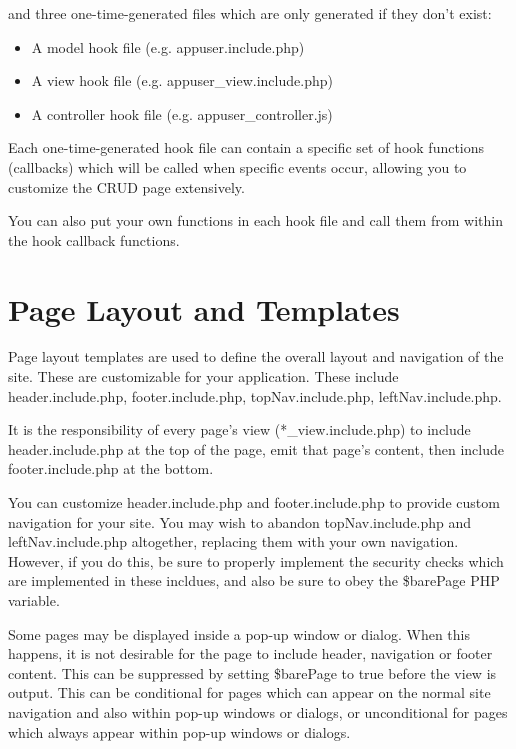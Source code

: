 \documentclass[letterpaper,10pt,english]{sphinxmanual}
\begin{document}
and three one-time-generated files which are only generated if they don't exist:
\begin{itemize}
\item {} 
A model hook file (e.g. appuser.include.php)

\item {} 
A view hook file (e.g. appuser\_view.include.php)

\item {} 
A controller hook file (e.g. appuser\_controller.js)

\end{itemize}

Each one-time-generated hook file can contain a specific set of hook functions (callbacks) which
will be called when specific events occur, allowing you to customize the CRUD page extensively.

You can also put your own functions in each hook file and call them from within the hook callback
functions.


\section{Page Layout and Templates}
\label{jaxFrameworkGuide:page-layout-and-templates}
Page layout templates are used to define the overall layout and navigation of the site.  These are
customizable for your application.  These include header.include.php, footer.include.php,
topNav.include.php, leftNav.include.php.

It is the responsibility of every page's view (*\_view.include.php) to include header.include.php at
the top of the page, emit that page's content, then include footer.include.php at the bottom.

You can customize header.include.php and footer.include.php to provide custom navigation for your
site.  You may wish to abandon topNav.include.php and leftNav.include.php altogether, replacing them
with your own navigation.  However, if you do this, be sure to properly implement the security
checks which are implemented in these incldues, and also be sure to obey the \$barePage PHP variable.

Some pages may be displayed inside a pop-up window or dialog.  When this happens, it is not
desirable for the page to include header, navigation or footer content.  This can be suppressed by
setting \$barePage to true before the view is output.  This can be conditional for pages which can
appear on the normal site navigation and also within pop-up windows or dialogs, or unconditional for
pages which always appear within pop-up windows or dialogs.
\end{document}
